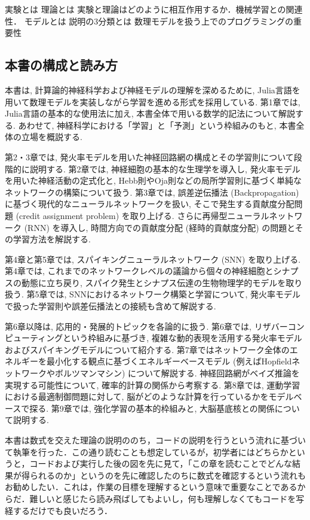 \documentclass[titlepage]{ltjsbook}
\begin{document}
実験とは
理論とは
実験と理論はどのように相互作用するか．機械学習との関連性．
モデルとは
説明の3分類とは
数理モデルを扱う上でのプログラミングの重要性

\subsection{本書の構成と読み方}
本書は, 計算論的神経科学および神経モデルの理解を深めるために, Julia言語を用いて数理モデルを実装しながら学習を進める形式を採用している. 第1章では, Julia言語の基本的な使用法に加え, 本書全体で用いる数学的記法について解説する. あわせて, 神経科学における「学習」と「予測」という枠組みのもと, 本書全体の立場を概説する. 

第2・3章では, 発火率モデルを用いた神経回路網の構成とその学習則について段階的に説明する. 第2章では, 神経細胞の基本的な生理学を導入し, 発火率モデルを用いた神経活動の定式化と, Hebb則やOja則などの局所学習則に基づく単純なネットワークの構築について扱う. 第3章では, 誤差逆伝播法 (Backpropagation) に基づく現代的なニューラルネットワークを扱い, そこで発生する貢献度分配問題 (credit assignment problem) を取り上げる. さらに再帰型ニューラルネットワーク (RNN) を導入し, 時間方向での貢献度分配 (経時的貢献度分配) の問題とその学習方法を解説する. 

第4章と第5章では, スパイキングニューラルネットワーク (SNN) を取り上げる. 第4章では, これまでのネットワークレベルの議論から個々の神経細胞とシナプスの動態に立ち戻り, スパイク発生とシナプス伝達の生物物理学的モデルを取り扱う. 第5章では, SNNにおけるネットワーク構築と学習について, 発火率モデルで扱った学習則や誤差伝播法との接続も含めて解説する. 

第6章以降は, 応用的・発展的トピックを各論的に扱う. 第6章では, リザバーコンピューティングという枠組みに基づき, 複雑な動的表現を活用する発火率モデルおよびスパイキングモデルについて紹介する. 第7章ではネットワーク全体のエネルギーを最小化する観点に基づくエネルギーベースモデル (例えばHopfieldネットワークやボルツマンマシン) について解説する. 神経回路網がベイズ推論を実現する可能性について, 確率的計算の関係から考察する. 第8章では, 運動学習における最適制御問題に対して, 脳がどのような計算を行っているかをモデルベースで探る. 第9章では, 強化学習の基本的枠組みと, 大脳基底核との関係について説明する. 

本書は数式を交えた理論の説明ののち，コードの説明を行うという流れに基づいて執筆を行った．この通り読むことも想定しているが，初学者にはどちらかというと，コードおよび実行した後の図を先に見て，「この章を読むことでどんな結果が得られるのか」というのを先に確認したのちに数式を確認するという流れもお勧めしたい．これは，作業の目標を理解するという意味で重要なことであるからだ．難しいと感じたら読み飛ばしてもよいし，何も理解しなくてもコードを写経するだけでも良いだろう．
\end{document}
